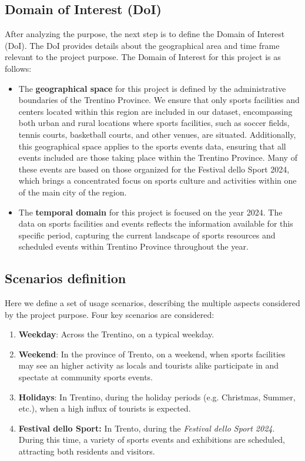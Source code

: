 \subsection{Domain of Interest (DoI)} 
After analyzing the purpose, the next step is to define the Domain of Interest (DoI). The DoI provides details about the geographical area and time frame relevant to the project purpose. The Domain of Interest for this project is as follows: 
\begin{itemize} 
    \item The \textbf{geographical space} for this project is defined by the administrative boundaries of the Trentino Province. We ensure that only sports facilities and centers located within this region are included in our dataset, encompassing both urban and rural locations where sports facilities, such as soccer fields, tennis courts, basketball courts, and other venues, are situated. Additionally, this geographical space applies to the sports events data, ensuring that all events included are those taking place within the Trentino Province. Many of these events are based on those organized for the Festival dello Sport 2024, which brings a concentrated focus on sports culture and activities within one of the main city of the region. 
    \item The \textbf{temporal domain} for this project is focused on the year 2024. The data on sports facilities and events reflects the information available for this specific period, capturing the current landscape of sports resources and scheduled events within Trentino Province throughout the year. 
\end{itemize}

\subsection{Scenarios definition}
Here we define a set of usage scenarios, describing the multiple aspects considered by the project purpose. Four key scenarios are considered:
\begin{enumerate}
    \item \textbf{Weekday}: Across the Trentino, on a typical weekday.
    \item \textbf{Weekend}: In the province of Trento, on a weekend, when sports facilities may see an higher activity as locals and tourists alike participate in and spectate at community sports events. 
    \item \textbf{Holidays}: In Trentino, during the holiday periods (e.g. Christmas, Summer, etc.), when a high influx of tourists is expected.
    \item \textbf{Festival dello Sport:} In Trento, during the \textit{Festival dello Sport 2024}. During this time, a variety of sports events and exhibitions are scheduled, attracting both residents and visitors. 
\end{enumerate}

